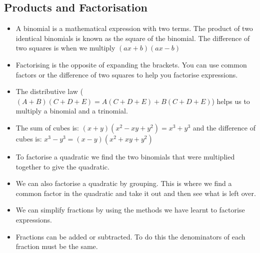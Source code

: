   \subsection* {Products and Factorisation}
\label{m39392*eip-735}
            \nopagebreak
            \label{m39392*uid0812}\begin{itemize}[itemsep=5pt]
            \item A binomial is a mathematical expression with two terms. The product of two identical binomials is known as the square of the binomial. The difference of two squares is when we multiply
                $\left(ax+b\right)\left(ax-b\right)$\item Factorising is the opposite of expanding the brackets. You can use common factors or the difference of two squares to help you factorise expressions.\item The distributive law ($\left(A+B\right)\left(C+D+E\right)=A\left(C+D+E\right)+B\left(C+D+E\right)$) helps us to multiply a binomial and a trinomial.\item The sum of cubes is: $\left(x+y\right)\left({x}^{2}-xy+{y}^{2}\right)={x}^{3}+{y}^{3}$ and the difference of cubes is: ${x}^{3}-{y}^{3}=\left(x-y\right)\left({x}^{2}+xy+{y}^{2}\right)$\item To factorise a quadratic we find the two binomials that were multiplied together to give the quadratic.\item We can also factorise a quadratic by grouping. This is where we find a common factor in the quadratic and take it out and then see what is left over.\item We can simplify fractions by using the methods we have learnt to factorise expressions.\item Fractions can be added or subtracted. To do this the denominators of each fraction must be the same.\end{itemize}
        \label{m39392*cid8}

